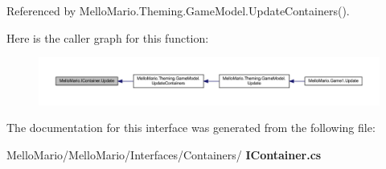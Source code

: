 Referenced by Mello\+Mario.\+Theming.\+Game\+Model.\+Update\+Containers().

Here is the caller graph for this function\+:
\nopagebreak
\begin{figure}[H]
\begin{center}
\leavevmode
\includegraphics[width=350pt]{interfaceMelloMario_1_1IContainer_a4d27256b126b8a3b596b06cf2def34c7_icgraph}
\end{center}
\end{figure}


The documentation for this interface was generated from the following file\+:\begin{DoxyCompactItemize}
\item 
Mello\+Mario/\+Mello\+Mario/\+Interfaces/\+Containers/\textbf{ I\+Container.\+cs}\end{DoxyCompactItemize}
